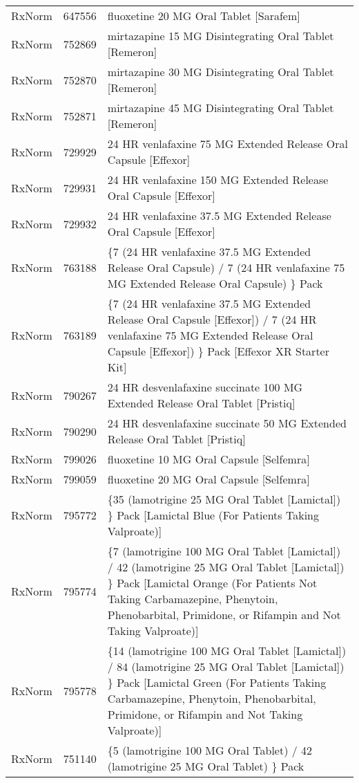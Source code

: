 \begin{longtable}{p{}p{}p{}}
  RxNorm & 647556 & fluoxetine 20 MG Oral Tablet [Sarafem] \\ 
  RxNorm & 752869 & mirtazapine 15 MG Disintegrating Oral Tablet [Remeron] \\ 
  RxNorm & 752870 & mirtazapine 30 MG Disintegrating Oral Tablet [Remeron] \\ 
  RxNorm & 752871 & mirtazapine 45 MG Disintegrating Oral Tablet [Remeron] \\ 
  RxNorm & 729929 & 24 HR venlafaxine 75 MG Extended Release Oral Capsule [Effexor] \\ 
  RxNorm & 729931 & 24 HR venlafaxine 150 MG Extended Release Oral Capsule [Effexor] \\ 
  RxNorm & 729932 & 24 HR venlafaxine 37.5 MG Extended Release Oral Capsule [Effexor] \\ 
  RxNorm & 763188 & \{7 (24 HR venlafaxine 37.5 MG Extended Release Oral Capsule) / 7 (24 HR venlafaxine 75 MG Extended Release Oral Capsule) \} Pack \\ 
  RxNorm & 763189 & \{7 (24 HR venlafaxine 37.5 MG Extended Release Oral Capsule [Effexor]) / 7 (24 HR venlafaxine 75 MG Extended Release Oral Capsule [Effexor]) \} Pack [Effexor XR Starter Kit] \\ 
  RxNorm & 790267 & 24 HR desvenlafaxine succinate 100 MG Extended Release Oral Tablet [Pristiq] \\ 
  RxNorm & 790290 & 24 HR desvenlafaxine succinate 50 MG Extended Release Oral Tablet [Pristiq] \\ 
  RxNorm & 799026 & fluoxetine 10 MG Oral Capsule [Selfemra] \\ 
  RxNorm & 799059 & fluoxetine 20 MG Oral Capsule [Selfemra] \\ 
  RxNorm & 795772 & \{35 (lamotrigine 25 MG Oral Tablet [Lamictal]) \} Pack [Lamictal Blue (For Patients Taking Valproate)] \\ 
  RxNorm & 795774 & \{7 (lamotrigine 100 MG Oral Tablet [Lamictal]) / 42 (lamotrigine 25 MG Oral Tablet [Lamictal]) \} Pack [Lamictal Orange (For Patients Not Taking Carbamazepine, Phenytoin, Phenobarbital, Primidone, or Rifampin and Not Taking Valproate)] \\ 
  RxNorm & 795778 & \{14 (lamotrigine 100 MG Oral Tablet [Lamictal]) / 84 (lamotrigine 25 MG Oral Tablet [Lamictal]) \} Pack [Lamictal Green (For Patients Taking Carbamazepine, Phenytoin, Phenobarbital, Primidone, or Rifampin and Not Taking Valproate)] \\ 
  RxNorm & 751140 & \{5 (lamotrigine 100 MG Oral Tablet) / 42 (lamotrigine 25 MG Oral Tablet) \} Pack \\ 

\end{longtable}
